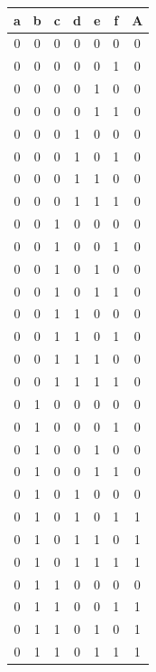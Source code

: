 \begin{table}[!tb]
    \centering
    \begin{tabular}{|c|c|c|c|c|c|c|}
        \hline
        \textbf{a} & \textbf{b} & \textbf{c} & \textbf{d} & \textbf{e} & \textbf{f} & \textbf{A} \\ \hline
        0 & 0 & 0 & 0 & 0 & 0 & 0 \\ \hline
        0 & 0 & 0 & 0 & 0 & 1 & 0 \\ \hline
        0 & 0 & 0 & 0 & 1 & 0 & 0 \\ \hline
        0 & 0 & 0 & 0 & 1 & 1 & 0 \\ \hline
        0 & 0 & 0 & 1 & 0 & 0 & 0 \\ \hline
        0 & 0 & 0 & 1 & 0 & 1 & 0 \\ \hline
        0 & 0 & 0 & 1 & 1 & 0 & 0 \\ \hline
        0 & 0 & 0 & 1 & 1 & 1 & 0 \\ \hline
        0 & 0 & 1 & 0 & 0 & 0 & 0 \\ \hline
        0 & 0 & 1 & 0 & 0 & 1 & 0 \\ \hline
        0 & 0 & 1 & 0 & 1 & 0 & 0 \\ \hline
        0 & 0 & 1 & 0 & 1 & 1 & 0 \\ \hline
        0 & 0 & 1 & 1 & 0 & 0 & 0 \\ \hline
        0 & 0 & 1 & 1 & 0 & 1 & 0 \\ \hline
        0 & 0 & 1 & 1 & 1 & 0 & 0 \\ \hline
        0 & 0 & 1 & 1 & 1 & 1 & 0 \\ \hline
        0 & 1 & 0 & 0 & 0 & 0 & 0 \\ \hline
        0 & 1 & 0 & 0 & 0 & 1 & 0 \\ \hline
        0 & 1 & 0 & 0 & 1 & 0 & 0 \\ \hline
        0 & 1 & 0 & 0 & 1 & 1 & 0 \\ \hline
        0 & 1 & 0 & 1 & 0 & 0 & 0 \\ \hline
        0 & 1 & 0 & 1 & 0 & 1 & 1 \\ \hline
        0 & 1 & 0 & 1 & 1 & 0 & 1 \\ \hline
        0 & 1 & 0 & 1 & 1 & 1 & 1 \\ \hline
        0 & 1 & 1 & 0 & 0 & 0 & 0 \\ \hline
        0 & 1 & 1 & 0 & 0 & 1 & 1 \\ \hline
        0 & 1 & 1 & 0 & 1 & 0 & 1 \\ \hline
        0 & 1 & 1 & 0 & 1 & 1 & 1 \\ \hline

\end{tabular}
\end{table}
